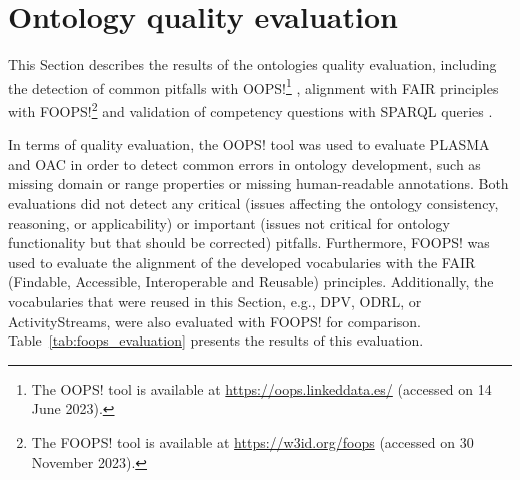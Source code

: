 \section{Ontology quality evaluation}
\label{sec:evaluation}

This Section describes the results of the ontologies quality evaluation, including the detection of common pitfalls with OOPS!\footnote{The OOPS! tool is available at \url{https://oops.linkeddata.es/} (accessed on 14 June 2023).} \citep{poveda-villalon_oops_2014}, alignment with FAIR principles with FOOPS!\footnote{The FOOPS! tool is available at \url{https://w3id.org/foops} (accessed on 30 November 2023).} \citep{garijo_foops_2021} and validation of competency questions with SPARQL queries \citep{harris_sparql_2013}.

In terms of quality evaluation, the OOPS! tool was used to evaluate PLASMA and OAC in order to detect common errors in ontology development, such as missing domain or range properties or missing human-readable annotations.
Both evaluations did not detect any critical (issues affecting the ontology consistency, reasoning, or applicability) or important (issues not critical for ontology functionality but that should be corrected) pitfalls.
Furthermore, FOOPS! was used to evaluate the alignment of the developed vocabularies with the FAIR (Findable, Accessible, Interoperable and Reusable) principles.
Additionally, the vocabularies that were reused in this Section, e.g., DPV, ODRL, or ActivityStreams, were also evaluated with FOOPS! for comparison.
Table~\ref{tab:foops_evaluation} presents the results of this evaluation.

\begin{table}[htp]
    \centering
    \caption{Evaluation of the alignment of the developed and reused vocabularies with FAIR principles using FOOPS!.}
    \label{tab:foops_evaluation}
\end{table}


